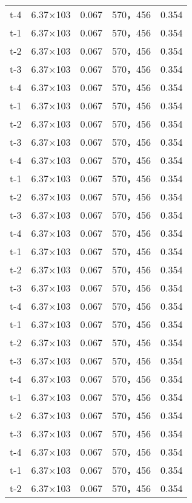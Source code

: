 \documentclass[../../main.tex]{subfiles}
\begin{document}
\begin{longtable}{ccccc}
t-4     &6.37×103       &0.067  &570，456        &0.354\\
t-1     &6.37×103       &0.067  &570，456        &0.354\\
t-2     &6.37×103       &0.067  &570，456        &0.354\\
t-3     &6.37×103       &0.067  &570，456        &0.354\\
t-4     &6.37×103       &0.067  &570，456        &0.354\\
t-1     &6.37×103       &0.067  &570，456        &0.354\\
t-2     &6.37×103       &0.067  &570，456        &0.354\\
t-3     &6.37×103       &0.067  &570，456        &0.354\\
t-4     &6.37×103       &0.067  &570，456        &0.354\\
t-1     &6.37×103       &0.067  &570，456        &0.354\\
t-2     &6.37×103       &0.067  &570，456        &0.354\\
t-3     &6.37×103       &0.067  &570，456        &0.354\\
t-4     &6.37×103       &0.067  &570，456        &0.354\\
t-1     &6.37×103       &0.067  &570，456        &0.354\\
t-2     &6.37×103       &0.067  &570，456        &0.354\\
t-3     &6.37×103       &0.067  &570，456        &0.354\\
t-4     &6.37×103       &0.067  &570，456        &0.354\\
t-1     &6.37×103       &0.067  &570，456        &0.354\\
t-2     &6.37×103       &0.067  &570，456        &0.354\\
t-3     &6.37×103       &0.067  &570，456        &0.354\\
t-4     &6.37×103       &0.067  &570，456        &0.354\\
t-1     &6.37×103       &0.067  &570，456        &0.354\\
t-2     &6.37×103       &0.067  &570，456        &0.354\\
t-3     &6.37×103       &0.067  &570，456        &0.354\\
t-4     &6.37×103       &0.067  &570，456        &0.354\\
t-1     &6.37×103       &0.067  &570，456        &0.354\\
t-2     &6.37×103       &0.067  &570，456        &0.354\\

\end{longtable}
\end{document}
